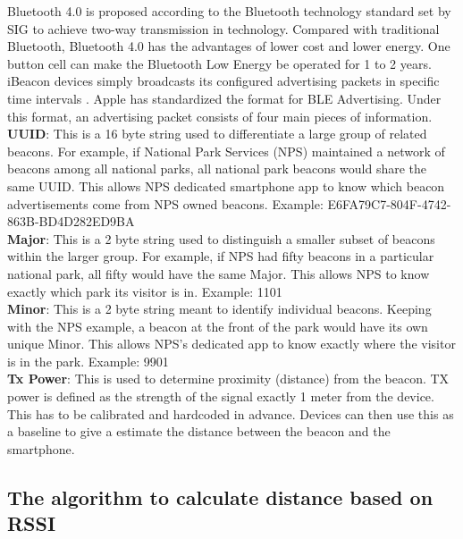 \documentclass[12pt]{article}
\begin{document}
Bluetooth 4.0 is proposed according to the Bluetooth technology standard set by SIG to achieve two-way transmission in technology. Compared with traditional Bluetooth, Bluetooth 4.0 has the advantages of lower cost and lower energy. One button cell can make the Bluetooth Low Energy be operated for 1 to 2 years. \cite{taiwan} \\

iBeacon devices simply broadcasts its configured advertising packets in specific time intervals \cite{one}. Apple has standardized the format for BLE Advertising. Under this format, an advertising packet consists of four main pieces of information. \\

\textbf{UUID}: This is a 16 byte string used to differentiate a large group of related beacons. For example, if National Park Services (NPS) maintained a network of beacons among all national parks, all national park beacons would share the same UUID. This allows NPS dedicated smartphone app to know which beacon advertisements come from NPS owned beacons. Example: E6FA79C7-804F-4742-863B-BD4D282ED9BA \\

\textbf{Major}: This is a 2 byte string used to distinguish a smaller subset of beacons within the larger group. For example, if NPS had fifty beacons in a particular national park, all fifty would have the same Major. This allows NPS to know exactly which park its visitor is in. Example: 1101  \\

\textbf{Minor}: This is a 2 byte string meant to identify individual beacons. Keeping with the NPS example, a beacon at the front of the park would have its own unique Minor. This allows NPS’s dedicated app to know exactly where the visitor is in the park. Example: 9901\\

\textbf{Tx Power}: This is used to determine proximity (distance) from the beacon. TX power is defined as the strength of the signal exactly 1 meter from the device. This has to be calibrated and hardcoded in advance. Devices can then use this as a baseline to give a estimate the distance between the beacon and the smartphone.  \\

\subsection{The algorithm to calculate distance based on RSSI}
\end{document}
